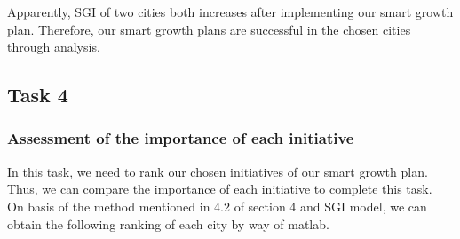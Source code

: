 \documentclass{mcmthesis}
\begin{document}
\noindent Apparently, SGI of two cities both increases after implementing our smart growth plan. Therefore, our smart growth plans are successful in the chosen cities through analysis.\\
\subsection{Task 4}%
\subsubsection{Assessment of the importance of each initiative}%
In this task, we need to rank our chosen initiatives of our smart growth plan. Thus, we can compare the importance of each initiative to complete this task.\\
On basis of the method mentioned in 4.2 of section 4 and SGI model, we can obtain the   following ranking of each city by way of matlab.\\
\end{document}
